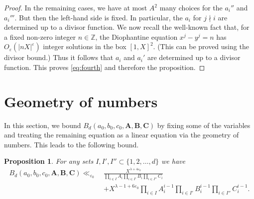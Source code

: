 \documentclass[a4paper,11pt,twoside,reqno]{amsart}
\def\Ab{\mathbf{A}}
\def\Bb{\mathbf{B}}
\def\Cb{\mathbf{C}}
\newcommand\ZZ{\mathbb{Z}}
\newcommand\ve{\varepsilon}
\theoremstyle{plain}
\newtheorem{prop}{Proposition}
\theoremstyle{remark}
\numberwithin{prop}{section}
\numberwithin{equation}{section}
\begin{document}
\begin{proof}
    In the remaining cases, we have at most $A^2$ many choices for the $a_i''$ and $a_i'''$.  But then the left-hand side is fixed. In particular, the $a_i$ for $j \nmid i$ are determined up to a divisor function. 
 We now recall the well-known fact that, for a fixed non-zero integer $n\in \ZZ$, 
   the Diophantine equation $x^j-y^j=n$ has $O_\ve(|nX|^\ve)$ integer solutions in the box $[1,X]^2$. 
   (This can be proved using the divisor bound.)
   Thus it follows that 
    $a_i$ and $a_i'$ are determined up to a divisor function. This proves \eqref{eq:fourth} and therefore the proposition.
\end{proof}

\section{Geometry of numbers}

In this section, we bound $B_d(a_0,b_0,c_0,\Ab,\Bb,\Cb)$ by fixing some of the variables and treating the remaining equation as a linear equation  via the geometry of numbers. This leads to the following bound.

\begin{prop}\label{prop:geometrybound}
    For any sets $I,I',I'' \subset \{1,2,\dots,d\}$ we have
    \begin{align*}
        B_d(a_0,b_0,c_0,\Ab,\Bb,\Cb) \ll_{\varepsilon_0}~& \frac{X^{\lambda+4\varepsilon_0}}{\prod_{i \in I} A_i \prod_{i \in I'} B_i \prod_{i \in I''} C_i} \\
        &+X^{\lambda-1+6\varepsilon_0} \prod_{i \in I} A_i^{i-1} \prod_{i \in I'} B_i^{i-1} \prod_{i \in I''} C_i^{i-1}.\end{align*}
\end{prop}
\end{document}
